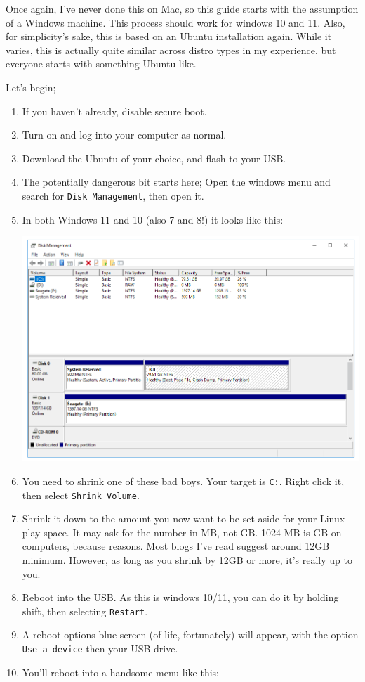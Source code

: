 \documentclass{book}
\begin{document}
Once again, I've never done this on Mac, so this guide starts with the assumption of a Windows machine. This process should work for windows 10 and 11. Also, for simplicity's sake, this is based on an Ubuntu installation again. While it varies, this is actually quite similar across distro types in my experience, but everyone starts with something Ubuntu like. 

Let's begin; 

\begin{enumerate} 
    \item If you haven't already, disable secure boot. 
    \item Turn on and log into your computer as normal. 
    \item Download the Ubuntu of your choice, and flash to your USB.
    \item The potentially dangerous bit starts here; Open the windows menu and search for \verb|Disk Management|, then open it. 
    \item In both Windows 11 and 10 (also 7 and 8!) it looks like this:

    \includegraphics[scale = 0.3]{dmgmt.png}

    \item You need to shrink one of these bad boys. Your target is \verb|C:|. Right click it, then select \verb|Shrink Volume|.
    \item Shrink it down to the amount you now want to be set aside for your Linux play space. It may ask for the number in MB, not GB. 1024 MB is GB on computers, because reasons. Most blogs I've read suggest around 12GB minimum. However, as long as you shrink by 12GB or more, it's really up to you. 
    \item Reboot into the USB. As this is windows 10/11, you can do it by holding shift, then selecting \verb|Restart|. 
    \item A reboot options blue screen (of life, fortunately) will appear, with the option \verb|Use a device| then your USB drive. 
    \item You'll reboot into a handsome menu like this: 


\end{enumerate}
\end{document}

